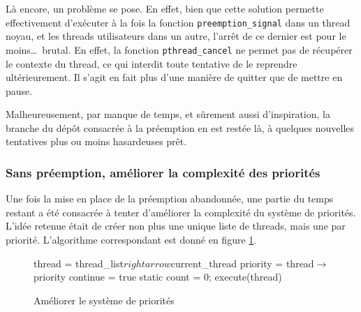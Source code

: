 \documentclass[a4paper,11pt]{article}
\begin{document}
Là encore, un problème se pose. En effet, bien que cette solution permette effectivement d'exécuter à la fois la fonction \texttt{preemption\_signal} dans un thread noyau, et les threads utilisateurs dans un autre, l'arrêt de ce dernier est pour le moins\dots\ brutal. En effet, la fonction \texttt{pthread\_cancel} ne permet pas de récupérer le contexte du thread, ce qui interdit toute tentative de le reprendre ultérieurement. Il s'agit en fait plus d'une manière de quitter que de mettre en pause.

Malheureusement, par manque de temps, et sûrement aussi d'inspiration, la branche du dépôt consacrée à la préemption en est restée là, à quelques nouvelles tentatives plus ou moins hasardeuses prêt.

\subsubsection*{Sans préemption, améliorer la complexité des priorités}

Une fois la mise en place de la préemption abandonnée, une partie du temps restant a été consacrée à tenter d'améliorer la complexité du système de priorités. L'idée retenue était de créer non plus une unique liste de threads, mais une par priorité. L'algorithme correspondant est donné en figure \ref{priority3}.

\begin{figure}[H]
\begin{algorithm}[H]
 thread = thread\_list$rightarrow$current\_thread\;
 priority = thread$\rightarrow$priority\;
 continue = true\;
 static count = 0;
 \BlankLine
 execute(thread)\;
\end{algorithm}
\caption{Améliorer le système de priorités}
\label{priority3}
\end{figure}
\end{document}
